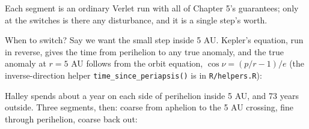 \documentclass[
  10.5pt,
  letterpaper,
]{scrbook}
\newenvironment{Shaded}{\begin{snugshade}}{\end{snugshade}}
\newcommand{\AttributeTok}[1]{\textcolor[rgb]{0.00,0.00,0.00}{#1}}
\newcommand{\CommentTok}[1]{\textcolor[rgb]{0.00,0.00,0.00}{\textit{#1}}}
\newcommand{\DecValTok}[1]{\textcolor[rgb]{0.00,0.00,0.00}{#1}}
\newcommand{\FunctionTok}[1]{\textcolor[rgb]{0.00,0.00,0.00}{#1}}
\newcommand{\NormalTok}[1]{\textcolor[rgb]{0.00,0.00,0.00}{#1}}
\newcommand{\OtherTok}[1]{\textcolor[rgb]{0.00,0.00,0.00}{#1}}
\newcommand{\SpecialCharTok}[1]{\textcolor[rgb]{0.00,0.00,0.00}{#1}}
\theoremstyle{plain}
\theoremstyle{remark}
\begin{document}
Each segment is an ordinary Verlet run with all of Chapter 5's
guarantees; only at the switches is there any disturbance, and it is a
single step's worth.

When to switch? Say we want the small step inside 5 AU. Kepler's
equation, run in reverse, gives the time from perihelion to any true
anomaly, and the true anomaly at \(r = 5\) AU follows from the orbit
equation, \(\cos\nu = (p/r - 1)/e\) (the inverse-direction helper
\texttt{time\_since\_periapsis()} is in \texttt{R/helpers.R}):

\begin{Shaded}
\end{Shaded}

Halley spends about a year on each side of perihelion inside 5 AU, and
73 years outside. Three segments, then: coarse from aphelion to the 5 AU
crossing, fine through perihelion, coarse back out:
\end{document}
